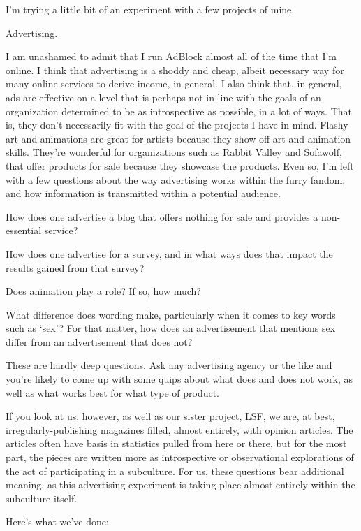 
I'm trying a little bit of an experiment with a few projects of mine.

Advertising.

I am unashamed to admit that I run AdBlock almost all of the time that I'm online. I think that advertising is a shoddy and cheap, albeit necessary way for many online services to derive income, in general. I also think that, in general, ads are effective on a level that is perhaps not in line with the goals of an organization determined to be as introspective as possible, in a lot of ways. That is, they don't necessarily fit with the goal of the projects I have in mind. Flashy art and animations are great for artists because they show off art and animation skills. They're wonderful for organizations such as Rabbit Valley and Sofawolf, that offer products for sale because they showcase the products. Even so, I'm left with a few questions about the way advertising works within the furry fandom, and how information is transmitted within a potential audience.

How does one advertise a blog that offers nothing for sale and provides a non-essential service?

How does one advertise for a survey, and in what ways does that impact the results gained from that survey?

Does animation play a role? If so, how much?

What difference does wording make, particularly when it comes to key words such as `sex'? For that matter, how does an advertisement that mentions sex differ from an advertisement that does not?

These are hardly deep questions. Ask any advertising agency or the like and you're likely to come up with some quips about what does and does not work, as well as what works best for what type of product.

If you look at us, however, as well as our sister project, LSF, we are, at best, irregularly-publishing magazines filled, almost entirely, with opinion articles. The articles often have basis in statistics pulled from here or there, but for the most part, the pieces are written more as introspective or observational explorations of the act of participating in a subculture. For us, these questions bear additional meaning, as this advertising experiment is taking place almost entirely within the subculture itself.

Here's what we've done:


